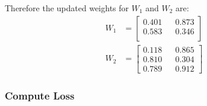 \documentclass[a4paper]{article}
\begin{document}
Therefore the updated weights for $W_{1}$ and $W_{2}$  are:
\begin{align*}
    W_{1} &= \left[\begin{matrix}     
             0.401 && 0.873 \\
             0.583 && 0.346 \\
        \end{matrix}\right]
    \\
    W_{2} &= \left[\begin{matrix}     
             0.118 && 0.865 \\
             0.810 && 0.304 \\
             0.789 && 0.912
        \end{matrix}\right]
\end{align*}{}

\subsubsection*{Compute Loss}
\end{document}
